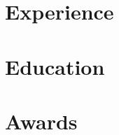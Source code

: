 \documentclass[a4paper]{article}
\begin{document}


\section{Experience}





% 
% 

% 
% 

\section{Education}


\section{Awards}




% 
% 
\end{document}
